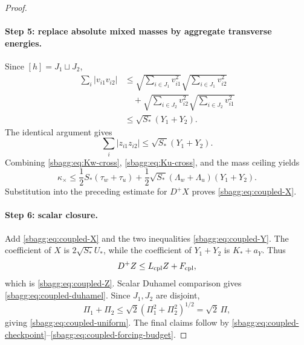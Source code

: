 \documentclass{article} %
\theoremstyle{plain}
\theoremstyle{definition}
\theoremstyle{remark}
\begin{document}
\begin{proof}
\paragraph{Step 5: replace absolute mixed masses by aggregate transverse
energies.}

Since $[h]=J_1\sqcup J_2$,
\[
\begin{aligned}
\sum_i|v_{i1}v_{i2}|
&\le
\sqrt{
\sum_{i\in J_1}v_{i1}^2
}
\sqrt{
\sum_{i\in J_1}v_{i2}^2
}
\\
&\quad+
\sqrt{
\sum_{i\in J_2}v_{i2}^2
}
\sqrt{
\sum_{i\in J_2}v_{i1}^2
}
\\
&\le
\sqrt{S_*}(Y_1+Y_2).
\end{aligned}
\]
The identical argument gives
\[
\sum_i|z_{i1}z_{i2}|
\le
\sqrt{S_*}(Y_1+Y_2).
\]
Combining \eqref{sbagg:eq:Kw-cross},
\eqref{sbagg:eq:Ku-cross}, and the mass ceiling yields
\[
\boxed{
\kappa_\times
\le
\frac12S_*(\tau_w+\tau_u)
+
\frac12\sqrt{S_*}
(\Lambda_w+\Lambda_u)
(Y_1+Y_2).
}
\tag{cross-ntk-bound}
\label{sbagg:eq:cross-ntk-bound}
\]
Substitution into the preceding estimate for $D^+X$ proves
\eqref{sbagg:eq:coupled-X}.

\paragraph{Step 6: scalar closure.}

Add \eqref{sbagg:eq:coupled-X} and the two inequalities
\eqref{sbagg:eq:coupled-Y}.  The coefficient of $X$ is
$2\sqrt{S_*}U_*$, while the coefficient of $Y_1+Y_2$ is
$K_*+a_Y$.  Thus
\[
D^+Z
\le
L_{\rm cpl}Z+F_{\rm cpl},
\]
which is \eqref{sbagg:eq:coupled-Z}.  Scalar Duhamel comparison gives
\eqref{sbagg:eq:coupled-duhamel}.  Since $J_1,J_2$ are disjoint,
\[
\Pi_1+\Pi_2
\le
\sqrt2
\left(
\Pi_1^2+\Pi_2^2
\right)^{1/2}
=
\sqrt2\,\Pi,
\]
giving \eqref{sbagg:eq:coupled-uniform}.  The final claims follow by
\eqref{sbagg:eq:coupled-checkpoint}--\eqref{sbagg:eq:coupled-forcing-budget}.
\end{proof}
\end{document}
